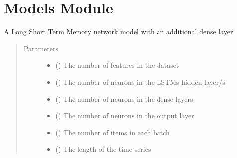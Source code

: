 \documentclass[letterpaper,10pt,english]{sphinxmanual}
\begin{document}
\chapter{Models Module}
\label{\detokenize{index:module-Forecaster.models}}\label{\detokenize{index:models-module}}

\begin{fulllineitems}
\label{\detokenize{index:Forecaster.models.LSTM}}
A Long Short Term Memory network model with an additional dense layer
\begin{quote}\begin{description}
\item[{Parameters}] \leavevmode\begin{itemize}
\item {} 
 () \textendash{} The number of features in the dataset

\item {} 
 () \textendash{} The number of neurons in the LSTMs hidden layer/s

\item {} 
 () \textendash{} The number of neurons in the dense layers

\item {} 
 () \textendash{} The number of neurons in the output layer

\item {} 
 () \textendash{} The number of items in each batch

\item {} 
 () \textendash{} The length of the time series


\end{itemize}
\end{description}
\end{quote}
\end{fulllineitems}
\end{document}
